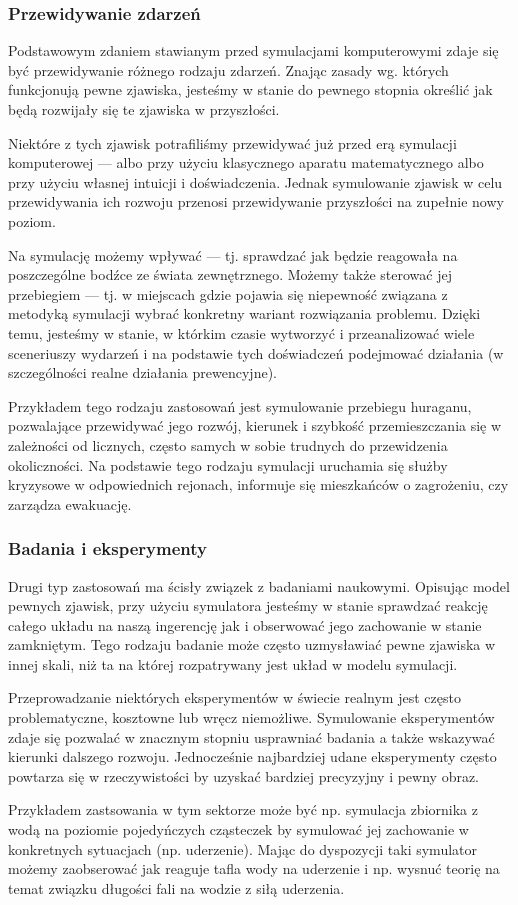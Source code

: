 \subsubsection{Przewidywanie zdarzeń}
\par{
Podstawowym zdaniem stawianym przed symulacjami komputerowymi zdaje się być przewidywanie różnego rodzaju zdarzeń. Znając zasady wg. których funkcjonują pewne zjawiska, jesteśmy w stanie do pewnego stopnia określić jak będą rozwijały się te zjawiska w przyszłości.
}
\par{
Niektóre z tych zjawisk potrafiliśmy przewidywać już przed erą symulacji komputerowej --- albo przy użyciu klasycznego aparatu matematycznego albo przy użyciu własnej intuicji i doświadczenia. Jednak symulowanie zjawisk w celu przewidywania ich rozwoju przenosi przewidywanie przyszłości na zupełnie nowy poziom.
}
\par{
Na symulację możemy wpływać --- tj. sprawdzać jak będzie reagowała na poszczególne bodźce ze świata zewnętrznego. Możemy także sterować jej przebiegiem --- tj. w miejscach gdzie pojawia się niepewność związana z metodyką symulacji wybrać konkretny wariant rozwiązania problemu.
Dzięki temu, jesteśmy w stanie, w którkim czasie wytworzyć i przeanalizować wiele sceneriuszy wydarzeń i na podstawie tych doświadczeń podejmować działania (w szczególności realne działania prewencyjne).
}
\par{
Przykładem tego rodzaju zastosowań jest symulowanie przebiegu huraganu, pozwalające przewidywać jego rozwój, kierunek i szybkość przemieszczania się w zależności od licznych, często samych w sobie trudnych do przewidzenia okoliczności. Na podstawie tego rodzaju symulacji uruchamia się służby kryzysowe w odpowiednich rejonach, informuje się mieszkańców o zagrożeniu, czy zarządza ewakuację.
}

\subsubsection{Badania i eksperymenty}
\par{
Drugi typ zastosowań ma ścisły związek z badaniami naukowymi.
Opisując model pewnych zjawisk, przy użyciu symulatora jesteśmy w stanie sprawdzać reakcję całego układu na naszą ingerencję jak i obserwować jego zachowanie w stanie zamkniętym. Tego rodzaju badanie może często uzmysławiać pewne zjawiska w innej skali, niż ta na której rozpatrywany jest układ w modelu symulacji.
}
\par{
Przeprowadzanie niektórych eksperymentów w świecie realnym jest często problematyczne, kosztowne lub wręcz niemożliwe. Symulowanie eksperymentów zdaje się pozwalać w znacznym stopniu usprawniać badania a także wskazywać kierunki dalszego rozwoju. Jednocześnie najbardziej udane eksperymenty często powtarza się w rzeczywistości by uzyskać bardziej precyzyjny i pewny obraz.
}
\par{
Przykładem zastsowania w tym sektorze może być np. symulacja zbiornika z wodą na poziomie pojedyńczych cząsteczek by symulować jej zachowanie w konkretnych sytuacjach (np. uderzenie). Mając do dyspozycji taki symulator możemy zaobserować jak reaguje tafla wody na uderzenie i np. wysnuć teorię na temat związku długości fali na wodzie z siłą uderzenia.
}

